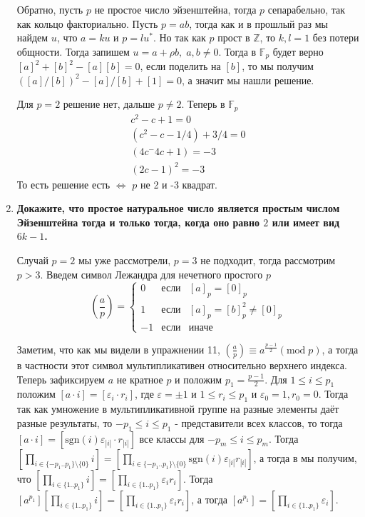 \documentclass{article}
\begin{document}
\begin{enumerate}
         Обратно, пусть $p$ не простое число эйзенштейна, тогда $p$ сепарабельно,
         так как кольцо факториально. Пусть $p=ab$, тогда как и в прошлый раз
         мы найдем $u$, что $a=ku$ и $p=lu^*$. Но так как $p$ прост в $\mathbb{Z}$,
         то $k,l=1$ без потери общности. Тогда запишем $u=a+\rho b,\;a,b\neq 0$.
         Тогда в $\mathbb{F}_p$ будет верно $[a]^2+[b]^2-[a][b]=0$, если
         поделить на $[b]$, то мы получим $([a]/[b])^2-[a]/[b]+[1]=0$, а значит
         мы нашли решение.

         Для $p=2$ решение нет, дальше $p\neq 2$. Теперь в $\mathbb{F}_p$
         \begin{align*}
             c^2-c+1=0\\
             (c^2-c-1/4)+3/4=0\\
             (4c^-4c+1) = -3\\
             (2c-1)^2=-3
         \end{align*}
         То есть решение есть $\Leftrightarrow$ $p$ не 2 и -3 квадрат.
        
     \item \textbf{Докажите, что простое натуральное число является простым
         числом Эйзенштейна тогда и только тогда, когда оно равно $2$ или имеет
         вид $6k−1$.}

        Случай $p=2$ мы уже рассмотрели, $p=3$ не подходит, тогда рассмотрим
        $p>3$. Введем символ Лежандра для нечетного простого $p$
        \[
            \left(\frac{a}{p}\right) =
            \left\{ \begin{array}{rcl}
                0 & \mbox{если} & [a]_p=[0]_p \\
                1  & \mbox{если} & [a]_p=[b]_p^2\neq[0]_p \\
                -1 & \mbox{если} & \mbox{иначе}
                \end{array}\right.
        \]

        Заметим, что как мы видели в упражнении 11, $\left(\frac{a}{p}\right)\equiv
        a^{\frac{p-1}{2}}(\mbox{mod}\;p)$, а тогда в частности этот символ
        мультипликативен относительно верхнего индекса. Теперь зафиксируем $a$
        не кратное $p$ и положим $p_1=\frac{p-1}{2}$. Для $1\leq i\leq p_1$
        положим $[a\cdot i]=[\varepsilon_i\cdot r_i]$, где $\varepsilon=\pm1$ и
        $1\leq r_i\leq p_1$ и $\varepsilon_0=1,r_0=0$. Тогда так как умножение в мультипликативной
        группе на разные элементы даёт разные результаты, то $-p_1\leq i\leq p_1$
        - представители всех классов, то тогда $[a\cdot i]=
        [\text{sgn}(i)\varepsilon_{|i|}\cdot r_{|i|}]$ все классы для $-p_m\leq i\leq p_m$.
        Тогда $[\prod_{i\in\{-p_1..p_1\}\setminus\{0\}}i]=[\prod_{i\in\{-p_1..p_1\}
        \setminus\{0\}}\text{sgn}(i)\varepsilon_{|i|}r_{|i|}]$, а тогда в мы
        получим, что $[\prod_{i\in\{1..p_1\}}i]=[\prod_{i\in\{1..p_1\}}\varepsilon_i
        r_i]$. Тогда $[a^{p_1}][\prod_{i\in\{1..p_1\}}i]=[\prod_{i\in\{1..p_1\}}
        \varepsilon_ir_i]$, а тогда $[a^{p_1}]=[\prod_{i\in\{1..p_1\}}\varepsilon_i]$.


\end{enumerate}
\end{document}
